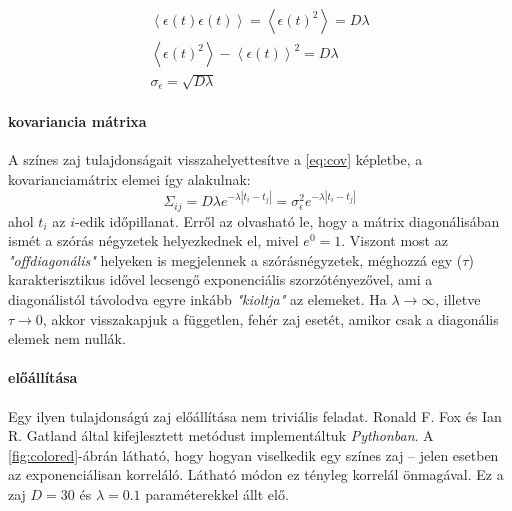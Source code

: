 \begin{gather}
	\left<\epsilon(t)\epsilon(t)\right> = \left<\epsilon(t)^2\right> = D\lambda \\
	\left<\epsilon(t)^2\right> - \left<\epsilon(t)\right>^2 = D\lambda \\
	\sigma_\epsilon = \sqrt{D\lambda}
\end{gather}

\paragraph{kovariancia mátrixa}
A színes zaj tulajdonságait visszahelyettesítve a \ref{eq:cov} képletbe, a kovarianciamátrix elemei így alakulnak:
\begin{equation}\label{eq:covmat_col}
\Sigma_{ij} = D\lambda e^{- \lambda |t_i - t_j|} = \sigma_\epsilon^2 e^{- \lambda |t_i - t_j|}
\end{equation}
ahol $t_i$ az $i$-edik időpillanat. Erről az olvasható le, hogy a mátrix diagonálisában ismét a szórás négyzetek helyezkednek el, mivel $e^0=1$. Viszont most az \textit{"offdiagonális"} helyeken is megjelennek a szórásnégyzetek, méghozzá egy ($\tau$) karakterisztikus idővel lecsengő exponenciális szorzótényezővel, ami a diagonálistól távolodva egyre inkább \textit{"kioltja"} az elemeket. Ha $\lambda \rightarrow \infty$, illetve $\tau \rightarrow 0$, akkor visszakapjuk a független, fehér zaj esetét, amikor csak a diagonális elemek nem nullák.


\paragraph{előállítása}
Egy ilyen tulajdonságú zaj előállítása nem triviális feladat. Ronald F. Fox és Ian R. Gatland által kifejlesztett metódust \cite{PhysRevA.38.5938} implementáltuk \textit{Pythonban}.
A \ref{fig:colored}-ábrán látható, hogy hogyan viselkedik egy színes zaj -- jelen esetben az exponenciálisan korreláló. Látható módon ez tényleg korrelál önmagával. Ez a zaj $D = 30$ és $\lambda = 0.1$ paraméterekkel állt elő.


